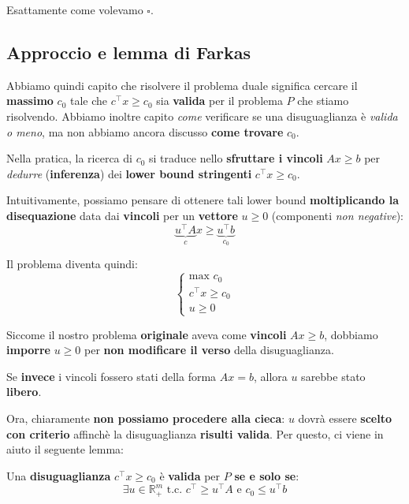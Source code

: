 Esattamente come volevamo $\square$.

\subsection{Approccio e lemma di Farkas}

Abbiamo quindi capito che risolvere il problema duale significa 
cercare il \textbf{massimo} $c_{0}$ tale che $c^\top x \ge c_{0}$ sia \textbf{valida} per
il problema $P$ che stiamo risolvendo. Abbiamo inoltre capito \textit{come}
verificare se una disuguaglianza è \textit{valida o meno}, ma non abbiamo
ancora discusso \textbf{come trovare} $c_{0}$.

Nella pratica, la ricerca di $c_{0}$ si traduce nello \textbf{sfruttare i vincoli} $Ax\ge b$ 
per \textit{dedurre} (\textbf{inferenza}) dei 
\textbf{lower bound stringenti} $c^\top x \ge c_{0}$.

Intuitivamente, possiamo pensare di ottenere tali lower bound 
\textbf{moltiplicando la disequazione} data dai \textbf{vincoli} 
per un \textbf{vettore} $u\ge 0$ (componenti \textit{non negative}):
\[
    \underbrace{ u^\top A }_{c} x \ge \underbrace{ u^\top b }_{c_{0}}
\]

Il problema diventa quindi:
\[
    \begin{cases}
        \text{max } c_{0} \\ 
        c^\top x \ge c_{0} \\
        u \ge 0 
    \end{cases}
\]

\begin{remark}[CONDIZIONI SU $u$]
    Siccome il nostro problema \textbf{originale} aveva come 
    \textbf{vincoli} $Ax\ge b$, dobbiamo \textbf{imporre} $u\ge 0$ per
    \textbf{non modificare il verso} della disuguaglianza.

    Se \textbf{invece} i vincoli fossero stati della forma
    $Ax=b$, allora $u$ sarebbe stato \textbf{libero}.
\end{remark}

Ora, chiaramente \textbf{non possiamo procedere alla cieca}: $u$ dovrà
essere \textbf{scelto con criterio} affinchè la disuguaglianza
\textbf{risulti valida}. Per questo, ci viene in aiuto il seguente lemma:

\begin{theorem}
    Una \textbf{disuguaglianza} $c^\top x \ge c_{0}$ è \textbf{valida}
    per $P$ \textbf{se e solo se}:
    \[
        \exists u \in \mathbb{R}_+^m \text{ t.c. } 
        c^\top \ge u^\top A \text{ e } c_{0} \le u^\top b
    \] 
\end{theorem}

